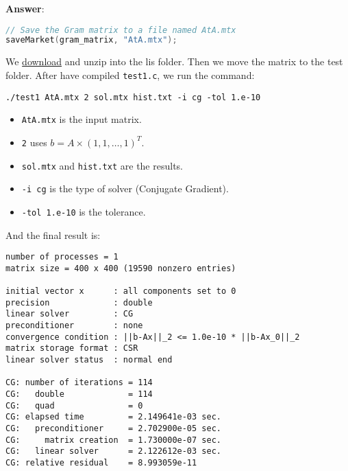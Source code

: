 \begin{enumerate}[label=\textcolor{Green3}{\textbf{\arabic*.}}]
    \textbf{Answer}:
    \begin{lstlisting}[language=C++]
// Save the Gram matrix to a file named AtA.mtx
saveMarket(gram_matrix, "AtA.mtx");\end{lstlisting}
    We \href{https://www.ssisc.org/lis/dl/lis-2.1.6.zip}{download} and unzip into the lis folder. Then we move the matrix to the test folder. After have compiled \texttt{test1.c}, we run the command:
    \begin{lstlisting}
./test1 AtA.mtx 2 sol.mtx hist.txt -i cg -tol 1.e-10\end{lstlisting}
    \begin{itemize}
        \item \texttt{AtA.mtx} is the input matrix.
        \item \texttt{2} uses $b = A \times \left(1, 1, \dots, 1\right)^{T}$.
        \item \texttt{sol.mtx} and \texttt{hist.txt} are the results.
        \item \texttt{-i cg} is the type of solver (Conjugate Gradient).
        \item \texttt{-tol 1.e-10} is the tolerance.
    \end{itemize}
    And the final result is:
    \begin{lstlisting}
number of processes = 1
matrix size = 400 x 400 (19590 nonzero entries)

initial vector x      : all components set to 0
precision             : double
linear solver         : CG
preconditioner        : none
convergence condition : ||b-Ax||_2 <= 1.0e-10 * ||b-Ax_0||_2
matrix storage format : CSR
linear solver status  : normal end

CG: number of iterations = 114
CG:   double             = 114
CG:   quad               = 0
CG: elapsed time         = 2.149641e-03 sec.
CG:   preconditioner     = 2.702900e-05 sec.
CG:     matrix creation  = 1.730000e-07 sec.
CG:   linear solver      = 2.122612e-03 sec.
CG: relative residual    = 8.993059e-11\end{lstlisting}
\end{enumerate}